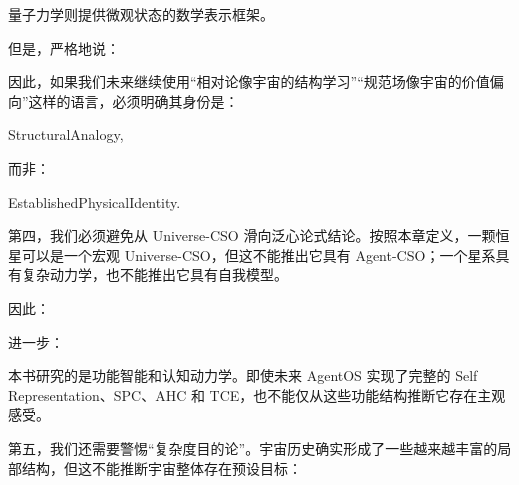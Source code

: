量子力学则提供微观状态的数学表示框架。

但是，严格地说：

\begin{statementbox}
\centering
{}
\end{statementbox}

\begin{statementbox}
\centering
{}
\end{statementbox}

\begin{statementbox}
\centering
{}
\end{statementbox}

因此，如果我们未来继续使用“相对论像宇宙的结构学习”“规范场像宇宙的价值偏向”这样的语言，必须明确其身份是：

\begin{statementbox}
StructuralAnalogy,
\end{statementbox}

而非：

\begin{statementbox}
EstablishedPhysicalIdentity.
\end{statementbox}

第四，我们必须避免从 Universe-CSO 滑向泛心论式结论。按照本章定义，一颗恒星可以是一个宏观 Universe-CSO，但这不能推出它具有 Agent-CSO；一个星系具有复杂动力学，也不能推出它具有自我模型。

因此：

\begin{statementbox}
\centering
{}
\end{statementbox}

进一步：

\begin{statementbox}
\centering
{}
\end{statementbox}

本书研究的是功能智能和认知动力学。即使未来 AgentOS 实现了完整的 Self Representation、SPC、AHC 和 TCE，也不能仅从这些功能结构推断它存在主观感受。

第五，我们还需要警惕“复杂度目的论”。宇宙历史确实形成了一些越来越丰富的局部结构，但这不能推断宇宙整体存在预设目标：

